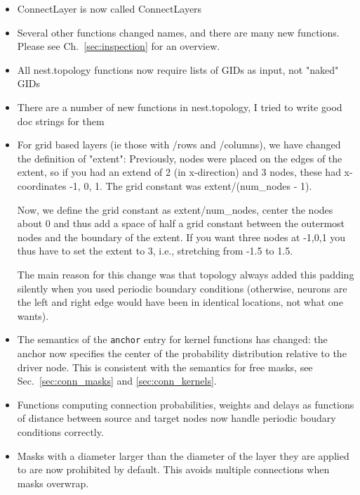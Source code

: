\documentclass[a4paper,12pt]{report}
\begin{document}
\begin{itemize}
\item ConnectLayer is now called ConnectLayers
\item Several other functions changed names, and there are many new
  functions. Please see Ch.~\ref{sec:inspection} for an overview.
\item All nest.topology functions now require lists of GIDs as input,
  not "naked" GIDs
\item There are a number of new functions in nest.topology, I tried to
  write good doc strings for them
\item For grid based layers (ie those with /rows and /columns), we
  have changed the definition of "extent": Previously, nodes were
  placed on the edges of the extent, so if you had an extend of 2 (in
  x-direction) and 3 nodes, these had x-coordinates -1, 0, 1. The grid
  constant was extent/(num\_nodes - 1).

  Now, we define the grid constant as extent/num\_nodes, center the
  nodes about 0 and thus add a space of half a grid constant between
  the outermost nodes and the boundary of the extent. If you want
  three nodes at -1,0,1 you thus have to set the extent to 3, i.e.,
  stretching from -1.5 to 1.5.

  The main reason for this change was that topology always added this
  padding silently when you used periodic boundary conditions
  (otherwise, neurons are the left and right edge would have been in
  identical locations, not what one wants).
\item The semantics of the \lstinline!anchor! entry for kernel
  functions has changed: the anchor now specifies the center of the
  probability distribution relative to the driver node. This is
  consistent with the semantics for free masks, see
  Sec.~\ref{sec:conn_masks} and \ref{sec:conn_kernels}.
\item Functions computing connection probabilities, weights and delays
  as functions of distance between source and target nodes now handle
  periodic boudary conditions correctly.
\item Masks with a diameter larger than the diameter of the layer they
  are applied to are now prohibited by default. This avoids multiple
  connections when masks overwrap.
\end{itemize}




\listoffigures %
\listoftables  %

\printindex  
\end{document}

